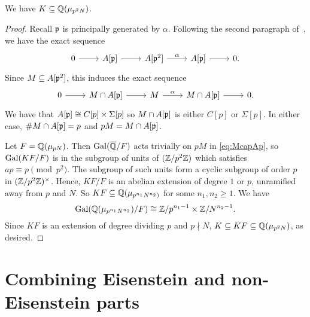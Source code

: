 \documentclass[thesis.tex]{subfiles}
\begin{document}
\begin{lemma}
    We have $K\subseteq \mathbb{Q}(\mu_{p^2N})$.
\end{lemma}
\begin{proof}
    Recall $\mathfrak{p}$ is principally generated by $\alpha$. Following the second
    paragraph of~\cite{mazur:eisenstein}, we have the exact sequence
    \[
        \begin{tikzcd}
            0 \arrow[r] &
            A[\p] \arrow[r] &
            A[\p^2] \arrow[r, "\alpha"] &
            A[\p] \arrow[r] &
            0.
        \end{tikzcd}
    \]
    Since $M\subseteq A[\mathfrak{p}^2]$, this induces the exact sequence
    \begin{equation}
        \label{eq:McapAp}
        \begin{tikzcd}
            0 \arrow[r] &
            M\cap A[\p] \arrow[r] &
            M \arrow[r, "\alpha"] &
            M\cap A[\p] \arrow[r] &
            0.
        \end{tikzcd}
    \end{equation}
    We have that $A[\mathfrak{p}]\cong C[p]\times \Sigma[p]$ so $M\cap A[\mathfrak{p}]$ is either
    $C[p]$ or $\Sigma[p]$. In either case, $\# M\cap A[\mathfrak{p}] = p$ and $pM=M\cap
    A[\mathfrak{p}]$.
    
    Let $F=\mathbb{Q}(\mu_{pN})$. Then $\operatorname{Gal}(\overline{\mathbb{Q}}/F)$ acts trivially on $pM$ in
    \eqref{eq:McapAp}, so $\operatorname{Gal}(KF/F)$ is in the subgroup of units of $(\mathbb{Z}/p^2
    \mathbb{Z})$ which satisfies $ap\equiv p \pmod{p^2}$. The subgroup of such units
    form a cyclic subgroup of order $p$ in $(\mathbb{Z}/p^2\mathbb{Z})^\times$. Hence, $KF/F$
    is an abelian extension of degree $1$ or $p$, unramified away from $p$ and
    $N$. So $KF\subseteq \mathbb{Q}(\mu_{p^{n_1}N^{n_2})}$ for some $n_1,n_2\geq 1$.
    We have
    \[
        \operatorname{Gal}(\mathbb{Q}(\mu_{p^{n_1}N^{n_2}})/F) \cong 
        \mathbb{Z}/p^{n_1-1} \times \mathbb{Z}/N^{n_2-1}.
    \]
    Since $KF$ is an extension of degree dividing $p$ and $p\nmid N$,
    $K\subseteq KF \subseteq \mathbb{Q}(\mu_{p^2N})$, as desired.
\end{proof}


\section{Combining Eisenstein and non-Eisenstein parts}%
\label{sec:combining_eisenstein_and_non_eisenstein_parts}
\end{document}
